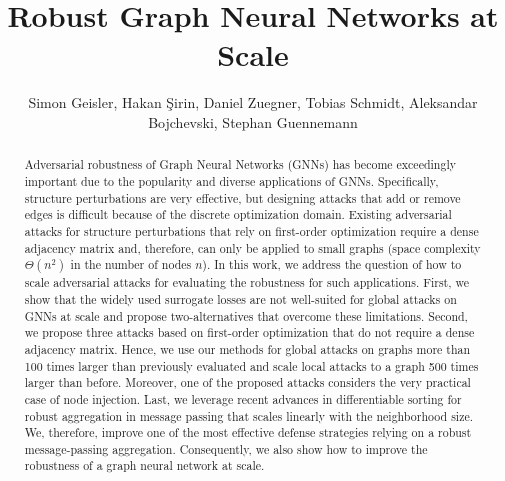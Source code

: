 \documentclass[sigconf,authordraft]{acmart}
\begin{document}
\title{Robust Graph Neural Networks at Scale}

\author{Simon Geisler, Hakan \c{S}irin, Daniel Zuegner, Tobias Schmidt, Aleksandar Bojchevski, Stephan Guennemann}

\renewcommand{\shortauthors}{Geisler et al.}

\begin{abstract}
  Adversarial robustness of Graph Neural Networks (GNNs) has become exceedingly important due to the popularity and diverse applications of GNNs. Specifically, structure perturbations are very effective, but designing attacks that add or remove edges is difficult because of the discrete optimization domain. Existing adversarial attacks for structure perturbations that rely on first-order optimization require a dense adjacency matrix and, therefore, can only be applied to small graphs (space complexity \(\Theta(n^2)\) in the number of nodes \(n\)).
  In this work, we address the question of how to scale adversarial attacks for evaluating the robustness for such applications.
  First, we show that the widely used surrogate losses are not well-suited for global attacks on GNNs at scale and propose two-alternatives that overcome these limitations.
  Second, we propose three attacks based on first-order optimization that do not require a dense adjacency matrix. Hence, we use our methods for global attacks on graphs more than 100 times larger than previously evaluated and scale local attacks to a graph 500 times larger than before. Moreover, one of the proposed attacks considers the very practical case of node injection.
  Last, we leverage recent advances in differentiable sorting for robust aggregation in message passing that scales linearly with the neighborhood size. We, therefore, improve one of the most effective defense strategies relying on a robust message-passing aggregation. Consequently, we also show how to improve the robustness of a graph neural network at scale.
\end{abstract}
\end{document}

